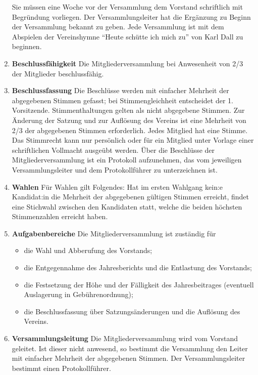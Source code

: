\documentclass{scrartcl}
\begin{document}
\begin{enumerate}
                Sie müssen eine Woche vor der Versammlung dem Vorstand schriftlich mit Begründung
                vorliegen. Der Versammlungsleiter hat die Ergänzung zu Beginn der Versammlung bekannt
                zu geben.
                Jede Versammlung ist mit dem Abspielen der Vereinshymne ``Heute schütte ich mich zu'' von Karl Dall zu beginnen.
            \item \textbf{Beschlussfähigkeit} \newline
                Die Mitgliederversammlung bei Anwesenheit von 2/3 der Mitglieder beschlussfähig.
            \item \textbf{Beschlussfassung} \newline
                Die Beschlüsse werden mit einfacher Mehrheit der abgegebenen Stimmen gefasst; bei
                Stimmengleichheit entscheidet der 1. Vorsitzende. Stimmenthaltungen gelten als nicht
                abgegebene Stimmen.
                Zur Änderung der Satzung und zur Auflösung des Vereins ist eine Mehrheit von 2/3 der
                abgegebenen Stimmen erforderlich.
                Jedes Mitglied hat eine Stimme. Das Stimmrecht kann nur persönlich oder für ein Mitglied
                unter Vorlage einer schriftlichen Vollmacht ausgeübt werden.
                Über die Beschlüsse der Mitgliederversammlung ist ein Protokoll aufzunehmen, das vom
                jeweiligen Versammlungsleiter und dem Protokollführer zu unterzeichnen ist.
            \item \textbf{Wahlen} \newline
                Für Wahlen gilt Folgendes: Hat im ersten Wahlgang kein:e Kandidat:in die Mehrheit der
                abgegebenen gültigen Stimmen erreicht, findet eine Stichwahl zwischen den Kandidaten statt,
                welche die beiden höchsten Stimmenzahlen erreicht haben.
            \item \textbf{Aufgabenbereiche} \newline
                Die Mitgliederversammlung ist zuständig für
                \begin{itemize}
                    \item die Wahl und Abberufung des Vorstands;
                    \item die Entgegennahme des Jahresberichts und die Entlastung des Vorstands;
                    \item die Festsetzung der Höhe und der Fälligkeit des Jahresbeitrages (eventuell Auslagerung in Gebührenordnung);
                    \item die Beschlussfassung über Satzungsänderungen und die Auflösung des Vereins.
                \end{itemize}
            \item \textbf{Versammlungsleitung} \newline  
                Die Mitgliederversammlung wird vom Vorstand geleitet. Ist dieser nicht anwesend, so bestimmt die Versammlung den Leiter mit einfacher
                Mehrheit der abgegebenen Stimmen. Der Versammlungsleiter bestimmt einen Protokollführer.
        \end{enumerate}
\end{document}
